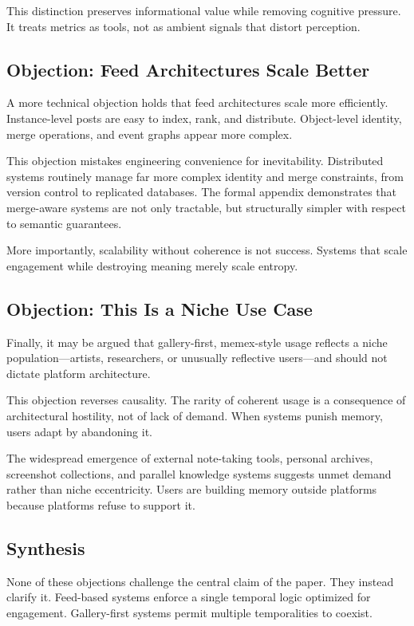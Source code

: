 \documentclass[11pt,oneside]{article}
\begin{document}
This distinction preserves informational value while removing cognitive pressure. It treats metrics as tools, not as ambient signals that distort perception.

\subsection{Objection: Feed Architectures Scale Better}

A more technical objection holds that feed architectures scale more efficiently. Instance-level posts are easy to index, rank, and distribute. Object-level identity, merge operations, and event graphs appear more complex.

This objection mistakes engineering convenience for inevitability. Distributed systems routinely manage far more complex identity and merge constraints, from version control to replicated databases. The formal appendix demonstrates that merge-aware systems are not only tractable, but structurally simpler with respect to semantic guarantees.

More importantly, scalability without coherence is not success. Systems that scale engagement while destroying meaning merely scale entropy.

\subsection{Objection: This Is a Niche Use Case}

Finally, it may be argued that gallery-first, memex-style usage reflects a niche population—artists, researchers, or unusually reflective users—and should not dictate platform architecture.

This objection reverses causality. The rarity of coherent usage is a consequence of architectural hostility, not of lack of demand. When systems punish memory, users adapt by abandoning it.

The widespread emergence of external note-taking tools, personal archives, screenshot collections, and parallel knowledge systems suggests unmet demand rather than niche eccentricity. Users are building memory outside platforms because platforms refuse to support it.

\subsection{Synthesis}

None of these objections challenge the central claim of the paper. They instead clarify it. Feed-based systems enforce a single temporal logic optimized for engagement. Gallery-first systems permit multiple temporalities to coexist.
\end{document}
